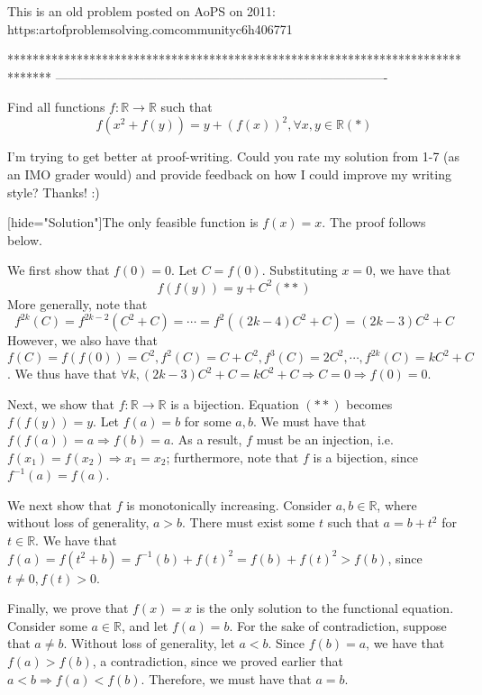 \begin{solution}
	This is an old problem posted on AoPS on 2011: https:\/\/artofproblemsolving.com\/community\/c6h406771
\end{solution}
*******************************************************************************
-------------------------------------------------------------------------------

\begin{problem}
	Find all functions $f:\mathbb{R}\rightarrow\mathbb{R}$ such that
\[
f(x^2+f(y))=y+\left(f(x)\right)^2, \forall x,y\in\mathbb{R} (*)
\]

I'm trying to get better at proof-writing. Could you rate my solution from 1-7 (as an IMO grader would) and provide feedback on how I could improve my writing style? Thanks! :)

[hide="Solution"]The only feasible function is $f(x) = x$. The proof follows below.

We first show that $f(0) = 0$. Let $C = f(0)$. Substituting $x = 0$, we have that
\[
f(f(y)) = y + C^2 (**)
\]
More generally, note that
\[
f^{2k}(C)= f^{2k-2}(C^2 + C) = \cdots = f^2((2k-4)C^2 + C) = (2k-3)C^2 + C
\]
However, we also have that $f(C) = f(f(0)) = C^2, f^2(C) = C + C^2, f^3(C) = 2C^2, \cdots, f^{2k}(C) = kC^2 + C$. We thus have that $\forall k, (2k-3)C^2 + C = kC^2 + C \Rightarrow C = 0 \Rightarrow f(0) = 0$.

Next, we show that $f:\mathbb{R}\rightarrow\mathbb{R}$ is a bijection. Equation $(**)$ becomes $f(f(y)) = y$. Let $f(a) = b$ for some $a, b$. We must have that $f(f(a)) = a \Rightarrow f(b) = a$. As a result, $f$ must be an injection, i.e. $f(x_1) = f(x_2) \Rightarrow x_1 = x_2$; furthermore, note that $f$ is a bijection, since $f^{-1}(a) = f(a)$.

We next show that $f$ is monotonically increasing. Consider $a, b \in \mathbb{R}$, where without loss of generality, $a > b$. There must exist some $t$ such that $a = b + t^2$ for $t\in \mathbb{R}$. We have that $f(a) = f(t^2 + b) = f^{-1}(b) + f(t)^2 = f(b) + f(t)^2 > f(b)$, since $t \neq 0, f(t) > 0$.

Finally, we prove that $f(x) = x$ is the only solution to the functional equation. Consider some $a\in \mathbb{R}$, and let $f(a) = b$. For the sake of contradiction, suppose that $a \neq b$. Without loss of generality, let $a < b$. Since $f(b) = a$, we have that $f(a) > f(b)$, a contradiction, since we proved earlier that $a < b \Rightarrow f(a) < f(b)$. Therefore, we must have that $a = b$.


\end{problem}
